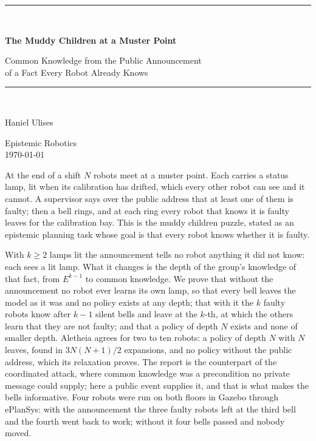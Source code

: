 \documentclass[11pt,a4paper]{article}
\theoremstyle{definition}
\begin{document}
\begin{titlepage}
\centering
\vspace*{2.4cm}
{\color{rulegrey}\rule{\textwidth}{0.8pt}}\\[0.9cm]
{\LARGE\bfseries The Muddy Children at a Muster Point\par}
\vspace{0.5cm}
{\large\color{slate} Common Knowledge from the Public Announcement\\
of a Fact Every Robot Already Knows\par}
\vspace{0.7cm}
{\color{rulegrey}\rule{\textwidth}{0.8pt}}\\[1.4cm]

{\large Haniel Ulises\par}
\vspace{0.3cm}
{\color{slate} Epistemic Robotics}\\
\vspace{0.15cm}
{\color{slate}\today}

\vfill
{\color{slate}\small
At the end of a shift $N$ robots meet at a muster point. Each carries a status
lamp, lit when its calibration has drifted, which every other robot can see and
it cannot. A supervisor says over the public address that at least one of them
is faulty; then a bell rings, and at each ring every robot that knows it is
faulty leaves for the calibration bay. This is the muddy children puzzle,
stated as an epistemic planning task whose goal is that every robot knows
whether it is faulty.

\vspace{0.6em}
With $k \geq 2$ lamps lit the announcement tells no robot anything it did not
know: each sees a lit lamp. What it changes is the depth of the group's
knowledge of that fact, from $E^{k-1}$ to common knowledge. We prove that
without the announcement no robot ever learns its own lamp, so that every bell
leaves the model as it was and no policy exists at any depth; that with it the
$k$ faulty robots know after $k-1$ silent bells and leave at the $k$-th, at
which the others learn that they are not faulty; and that a policy of depth
$N$ exists and none of smaller depth. Aletheia agrees for two to ten robots: a
policy of depth $N$ with $N$ leaves, found in $3N(N+1)/2$ expansions, and no
policy without the public address, which its relaxation proves. The report is
the counterpart of the coordinated attack, where common knowledge was a
precondition no private message could supply; here a public event supplies it,
and that is what makes the bells informative. Four robots were run on both
floors in Gazebo through ePlanSys: with the announcement the three faulty robots
left at the third bell and the fourth went back to work; without it four bells
passed and nobody moved.}
\vspace{1.2cm}
\end{titlepage}
\end{document}
